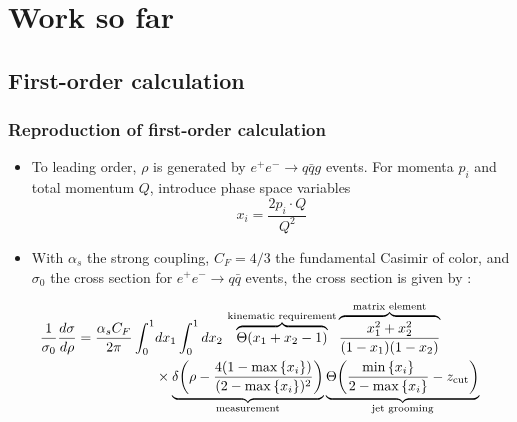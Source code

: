 \documentclass{beamer}
\newcommand{\zcut}{z_\mathrm{cut}}
\begin{document}
\section{Work so far}
\subsection{First-order calculation}
	\begin{frame}
		\frametitle{Reproduction of first-order calculation}

		\begin{itemize}

			\item To leading order, $\rho$ is generated by $e^+ e^- \to q \bar q g$ events. For momenta $p_i$ and total momentum $Q$, introduce phase space variables
			\begin{equation*}
				x_i = \frac{2p_i \cdot Q}{Q^2}
			\end{equation*}

			\item With $\alpha_s$ the strong coupling, $C_F = 4/3$ the fundamental Casimir of color, and $\sigma_0$ the cross section for $e^+ e^- \to q\bar q$ events, the cross section is given by \cite{larkoski_improving_2020}:
		\end{itemize}

		\begin{equation*}
			\begin{aligned}
				\frac{1}{\sigma_0}\frac{d\sigma}{d\rho} = \frac{\alpha_s C_F}{2\pi}\int_0^1 &dx_1 \int_0^1 dx_2\,\overbrace{\Theta(x_1 + x_2 - 1)}^{\text{kinematic requirement}} \overbrace{\frac{x_1^2 + x_2^2}{(1 - x_1)(1 - x_2)}}^{\text{matrix element}} \\
					&\times \underbrace{\delta\qty(\rho - \frac{4(1 - \max\qty{x_i})}{(2 - \max\qty{x_i})^2})}_{\text{measurement}} \underbrace{\Theta\qty(\frac{\min\qty{x_i}}{2 - \max\qty{x_i}} - \zcut)}_{\text{jet grooming}}
			\end{aligned}
			\end{equation*}
	\end{frame}
\end{document}
